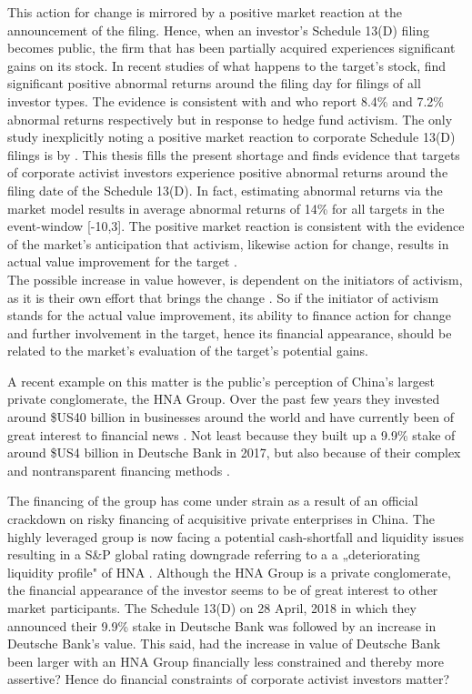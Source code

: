 \documentclass[12pt]{article}
\begin{document}
This action for change is mirrored by a positive market reaction at the announcement of the filing. Hence, when an investor's Schedule 13(D) filing becomes public, the firm that has been partially acquired experiences significant gains on its stock. In recent studies of what happens to the target's stock, \citet[p.1564]{Collin-Dufresne2015} find significant positive abnormal returns around the filing day for filings of all investor types. The evidence is consistent with \citet[p.1756]{Brav2008} and \citet[p.209]{Klein2009} who report 8.4\% and 7.2\% abnormal returns respectively but in response to hedge fund activism. The only study inexplicitly noting a positive market reaction to corporate Schedule 13(D) filings is by \citet[p.29]{Brigida2012}. This thesis fills the present shortage and finds evidence that targets of corporate activist investors experience positive abnormal returns around the filing date of the Schedule 13(D). In fact, estimating abnormal returns via the market model results in average abnormal returns of 14\% for all targets in the event-window [-10,3]. The positive market reaction is consistent with the evidence of the market's anticipation that activism, likewise action for change, results in actual value improvement for the target \citep[p.1760]{Brav2008}.\\
The possible increase in value however, is dependent on the initiators of activism, as it is their own effort that brings the change \citep[p.1563]{Collin-Dufresne2015}. So if the initiator of activism stands for the actual value improvement, its ability to finance action for change and further involvement in the target, hence its financial appearance, should be related to the market's evaluation of the target's potential gains.\par
A recent example on this matter is the public's perception of China's largest private conglomerate, the HNA Group. Over the past few years they invested around \$US40 billion in businesses around the world and have currently been of great interest to financial news \citep{Smith2018}. Not least because they built up a 9.9\% stake of around \$US4 billion in Deutsche Bank in 2017, but also because of their complex and nontransparent financing methods \citep{Lockett2018}.\par
The financing of the group has come under strain as a result of an official crackdown on risky financing of acquisitive private enterprises in China. The highly leveraged group is now facing a potential cash-shortfall and liquidity issues resulting in a S\&P global rating downgrade referring to a a „deteriorating liquidity profile" of HNA \citep{Schuetze2018}. Although the HNA Group is a private conglomerate, the financial appearance of the investor seems to be of great interest to other market participants. The Schedule 13(D) on 28 April, 2018 in which they announced their 9.9\% stake in Deutsche Bank was followed by an increase in Deutsche Bank's value. This said, had the increase in value of Deutsche Bank been larger with an HNA Group financially less constrained and thereby more assertive? Hence do financial constraints of corporate activist investors matter?\par
\end{document}
